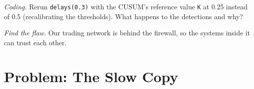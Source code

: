 \begin{exercise}[$\star\star\star$]\label{exo:pl:security:7}
\emph{Coding.} Rerun \texttt{delays(0.3)} with the CUSUM's reference value \texttt{K} at 0.25 instead of 0.5 (recalibrating the thresholds).
What happens to the detections and why?
\end{exercise}

\begin{exercise}[$\star\star\star$]\label{exo:pl:security:8}
\emph{Find the flaw.} \textquotedbl{}Our trading network is behind the firewall, so the systems inside it can trust each other.\textquotedbl{}
\end{exercise}

\section{Problem: The Slow Copy}


